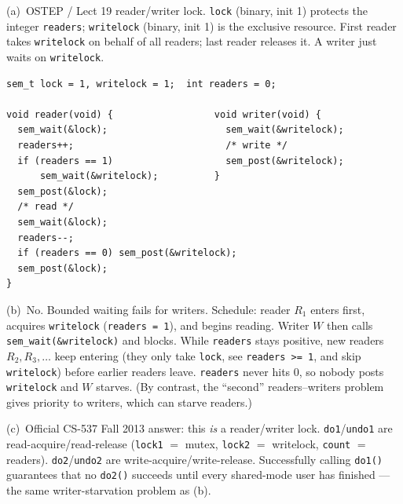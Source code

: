 \documentclass[11pt,a4paper]{article}
\newenvironment{Sol}{%
  \begin{tcolorbox}[sboxstyle, title={Solution}]%
}{%
  \end{tcolorbox}\vspace{0.35em}%
}
\begin{document}
\begin{Sol}
(a)~OSTEP / Lect 19 reader/writer lock. \texttt{lock} (binary, init 1)
protects the integer \texttt{readers}; \texttt{writelock} (binary, init 1)
is the exclusive resource. First reader takes \texttt{writelock} on behalf
of all readers; last reader releases it. A writer just waits on
\texttt{writelock}.
\begin{lstlisting}[numbers=none]
sem_t lock = 1, writelock = 1;  int readers = 0;

void reader(void) {                  void writer(void) {
  sem_wait(&lock);                     sem_wait(&writelock);
  readers++;                           /* write */
  if (readers == 1)                    sem_post(&writelock);
      sem_wait(&writelock);          }
  sem_post(&lock);
  /* read */
  sem_wait(&lock);
  readers--;
  if (readers == 0) sem_post(&writelock);
  sem_post(&lock);
}
\end{lstlisting}

(b)~No. Bounded waiting fails for writers. Schedule: reader $R_1$ enters first, acquires \texttt{writelock} (\texttt{readers = 1}), and begins reading. Writer $W$ then calls \texttt{sem\_wait(\&writelock)} and blocks. While \texttt{readers} stays positive, new readers $R_2, R_3, \ldots$ keep entering (they only take \texttt{lock}, see \texttt{readers >= 1}, and skip \texttt{writelock}) before earlier readers leave. \texttt{readers} never hits 0, so nobody posts \texttt{writelock} and $W$ starves. (By contrast, the ``second'' readers--writers problem gives
priority to writers, which can starve readers.)

(c)~Official CS-537 Fall 2013 answer: this \emph{is} a reader/writer lock.
\texttt{do1}/\texttt{undo1} are read-acquire/read-release
(\texttt{lock1} $=$ mutex, \texttt{lock2} $=$ writelock,
\texttt{count} $=$ readers). \texttt{do2}/\texttt{undo2} are
write-acquire/write-release. Successfully calling \texttt{do1()}
guarantees that no \texttt{do2()} succeeds until every shared-mode user
has finished --- the same writer-starvation problem as (b).
\end{Sol}
\end{document}

